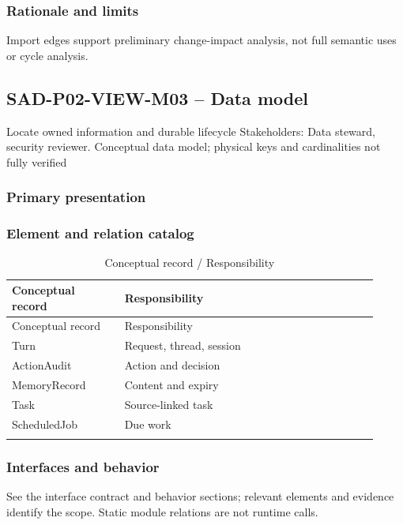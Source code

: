 \documentclass[10pt,letterpaper]{article}
\begin{document}
\subsubsection{Rationale and limits}
Import edges support preliminary change-impact analysis, not full semantic uses or cycle analysis.
\subsection{SAD-P02-VIEW-M03 -- Data model}
Locate owned information and durable lifecycle Stakeholders: Data steward, security reviewer. Conceptual data model; physical keys and cardinalities not fully verified
\subsubsection{Primary presentation}

\subsubsection{Element and relation catalog}
\begin{longtable}{@{}>{\raggedright\arraybackslash}p{0.29\linewidth}>{\raggedright\arraybackslash}p{0.63\linewidth}@{}}
\caption{Conceptual record / Responsibility}\\
\toprule Conceptual record & Responsibility\\\midrule\endfirsthead
\toprule Conceptual record & Responsibility\\\midrule\endhead
Turn & Request, thread, session\\\addlinespace
ActionAudit & Action and decision\\\addlinespace
MemoryRecord & Content and expiry\\\addlinespace
Task & Source-linked task\\\addlinespace
ScheduledJob & Due work\\\addlinespace
\bottomrule\end{longtable}

\subsubsection{Interfaces and behavior}
See the interface contract and behavior sections; relevant elements and evidence identify the scope. Static module relations are not runtime calls.
\end{document}
